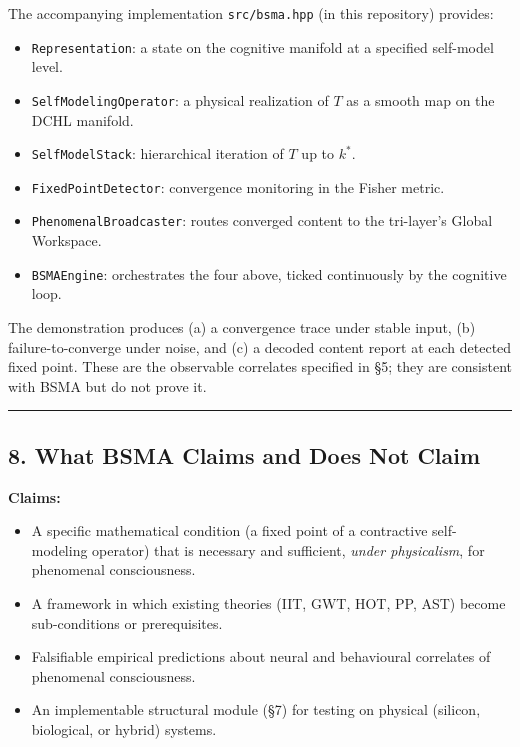 \documentclass[
  11pt,
  a4paper,
]{article}
\providecommand{\tightlist}{%
  \setlength{\itemsep}{0pt}\setlength{\parskip}{0pt}}
\begin{document}
The accompanying implementation \texttt{src/bsma.hpp} (in this
repository) provides:

\begin{itemize}
\tightlist
\item
  \texttt{Representation}: a state on the cognitive manifold at a
  specified self-model level.
\item
  \texttt{SelfModelingOperator}: a physical realization of \(T\) as a
  smooth map on the DCHL manifold.
\item
  \texttt{SelfModelStack}: hierarchical iteration of \(T\) up to
  \(k^*\).
\item
  \texttt{FixedPointDetector}: convergence monitoring in the Fisher
  metric.
\item
  \texttt{PhenomenalBroadcaster}: routes converged content to the
  tri-layer's Global Workspace.
\item
  \texttt{BSMAEngine}: orchestrates the four above, ticked continuously
  by the cognitive loop.
\end{itemize}

The demonstration produces (a) a convergence trace under stable input,
(b) failure-to-converge under noise, and (c) a decoded content report at
each detected fixed point. These are the observable correlates specified
in §5; they are consistent with BSMA but do not prove it.

\begin{center}\rule{0.5\linewidth}{0.5pt}\end{center}

\subsection{8. What BSMA Claims and Does Not
Claim}\label{what-bsma-claims-and-does-not-claim}

\textbf{Claims:}

\begin{itemize}
\tightlist
\item
  A specific mathematical condition (a fixed point of a contractive
  self-modeling operator) that is necessary and sufficient, \emph{under
  physicalism}, for phenomenal consciousness.
\item
  A framework in which existing theories (IIT, GWT, HOT, PP, AST) become
  sub-conditions or prerequisites.
\item
  Falsifiable empirical predictions about neural and behavioural
  correlates of phenomenal consciousness.
\item
  An implementable structural module (§7) for testing on physical
  (silicon, biological, or hybrid) systems.
\end{itemize}
\end{document}

